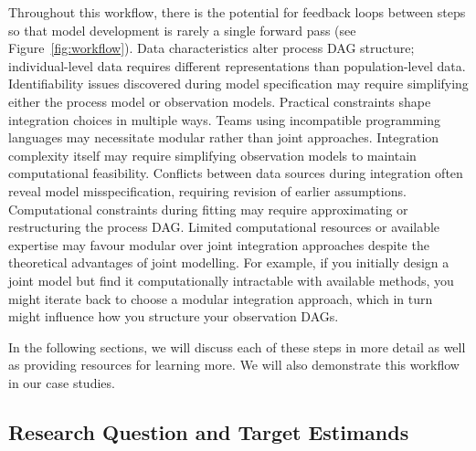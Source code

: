 \documentclass{article}
\begin{document}
Throughout this workflow, there is the potential for feedback loops between steps so that model development is rarely a single forward pass (see Figure~\ref{fig:workflow}). 
Data characteristics alter process DAG structure; individual-level data requires different representations than population-level data. 
Identifiability issues discovered during model specification may require simplifying either the process model or observation models. 
Practical constraints shape integration choices in multiple ways. Teams using incompatible programming languages may necessitate modular rather than joint approaches. 
Integration complexity itself may require simplifying observation models to maintain computational feasibility. Conflicts between data sources during integration often reveal model misspecification, requiring revision of earlier assumptions. 
Computational constraints during fitting may require approximating or restructuring the process DAG. Limited computational resources or available expertise may favour modular over joint integration approaches despite the theoretical advantages of joint modelling. 
For example, if you initially design a joint model but find it computationally intractable with available methods, you might iterate back to choose a modular integration approach, which in turn might influence how you structure your observation DAGs.

In the following sections, we will discuss each of these steps in more detail as well as providing resources for learning more. We will also demonstrate this workflow in our case studies.

\subsection{Research Question and Target Estimands}
\end{document}
